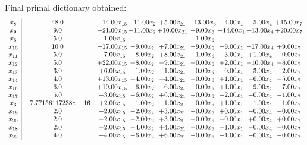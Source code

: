 \documentclass[8pt]{article}
\begin{document}
 Final primal dictionary obtained: 
\[\begin{array}{c| c c@{\hskip 2pt} c@{\hskip 2pt} c@{\hskip 2pt} c@{\hskip 2pt} c@{\hskip 2pt} c@{\hskip 2pt} c@{\hskip 2pt} }
 x_{8}   &  48.0 & -14.00 x_{15} & -11.00 x_{2} & +  5.00 x_{21} & -13.00 x_{6} & -4.00 x_{1} & -5.00 x_{4} & + 15.00 x_{7}\\
 x_{9}   &  9.0 & -21.00 x_{15} & -11.00 x_{2} & + 10.00 x_{21} & +  9.00 x_{6} & -14.00 x_{1} & + 13.00 x_{4} & + 20.00 x_{7}\\
 x_{5}   &  5.0 & -1.00 x_{15} &    &   & -1.00 x_{6} &    &    &   \\
 x_{10}   &  10.0 & -17.00 x_{15} & -9.00 x_{2} & +  7.00 x_{21} & -9.00 x_{6} & -9.00 x_{1} & + 17.00 x_{4} & +  9.00 x_{7}\\
 x_{11}   &  5.0 & -7.00 x_{15} & -8.00 x_{2} & +  8.00 x_{21} & -1.00 x_{6} & -3.00 x_{1} & +  1.00 x_{4} & -0.00 x_{7}\\
 x_{12}   &  5.0 & + 22.00 x_{15} & +  8.00 x_{2} & -9.00 x_{21} & +  0.00 x_{6} & +  2.00 x_{1} & -10.00 x_{4} & -8.00 x_{7}\\
 x_{13}   &  3.0 & +  6.00 x_{15} & +  1.00 x_{2} & -1.00 x_{21} & -0.00 x_{6} & -0.00 x_{1} & -3.00 x_{4} & -2.00 x_{7}\\
 x_{14}   &  4.0 & + 13.00 x_{15} & +  4.00 x_{2} & -4.00 x_{21} & -0.00 x_{6} & +  1.00 x_{1} & -6.00 x_{4} & -5.00 x_{7}\\
 x_{16}   &  6.0 & + 19.00 x_{15} & +  6.00 x_{2} & -6.00 x_{21} & -0.00 x_{6} & +  1.00 x_{1} & -9.00 x_{4} & -7.00 x_{7}\\
 x_{17}   &  5.0 & -3.00 x_{15} & -6.00 x_{2} & +  6.00 x_{21} & -0.00 x_{6} & -2.00 x_{1} & -0.00 x_{4} & -1.00 x_{7}\\
 x_{3}   &  -7.77156117238e-16 & +  2.00 x_{15} & +  1.00 x_{2} & -1.00 x_{21} & +  0.00 x_{6} & +  1.00 x_{1} & -1.00 x_{4} & -1.00 x_{7}\\
 x_{19}   &  2.0 & -2.00 x_{15} & -2.00 x_{2} & +  3.00 x_{21} & -0.00 x_{6} & +  0.00 x_{1} & -0.00 x_{4} & -0.00 x_{7}\\
 x_{20}   &  2.0 & -2.00 x_{15} & -2.00 x_{2} & +  3.00 x_{21} & +  0.00 x_{6} & -0.00 x_{1} & +  0.00 x_{4} & +  0.00 x_{7}\\
 x_{18}   &  2.0 & -2.00 x_{15} & -4.00 x_{2} & +  4.00 x_{21} & -0.00 x_{6} & -1.00 x_{1} & -0.00 x_{4} & -0.00 x_{7}\\
 x_{22}   &  4.0 & -4.00 x_{15} & -6.00 x_{2} & +  6.00 x_{21} & -0.00 x_{6} & -1.00 x_{1} & -0.00 x_{4} & -0.00 x_{7}\\

\end{array}\]
\end{document}
